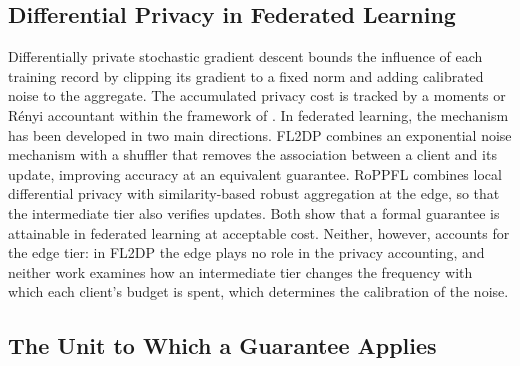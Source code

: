 \subsection{Differential Privacy in Federated Learning}

Differentially private stochastic gradient descent \cite{ref6} bounds the
influence of each training record by clipping its gradient to a fixed norm and
adding calibrated noise to the aggregate. The accumulated privacy cost is
tracked by a moments or R\'enyi accountant \cite{ref7} within the framework of
\cite{ref8}. In federated learning, the mechanism has been developed in two
main directions. FL2DP \cite{ref9} combines an exponential noise mechanism with
a shuffler that removes the association between a client and its update,
improving accuracy at an equivalent guarantee. RoPPFL \cite{ref10} combines
local differential privacy with similarity-based robust aggregation at the
edge, so that the intermediate tier also verifies updates. Both show that a
formal guarantee is attainable in federated learning at acceptable cost.
Neither, however, accounts for the edge tier: in FL2DP the edge plays no role
in the privacy accounting, and neither work examines how an intermediate tier
changes the frequency with which each client's budget is spent, which
determines the calibration of the noise.

\subsection{The Unit to Which a Guarantee Applies}

